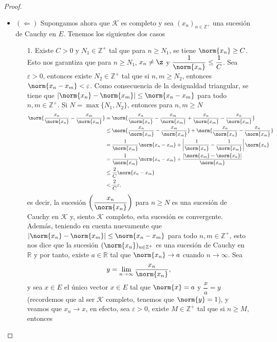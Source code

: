 \begin{proof}
\begin{itemize}
        \item $(\Longleftarrow)$ Supongamos ahora que $\mathcal{K}$ es completo y sea $(x_n)_{n \in \mathbb{Z}^+}$ una sucesión de Cauchy en $E$. Tenemos los siguientes dos casos
        \begin{enumerate}
            \item[1.] Existe $C>0$ y $N_1\in \mathbb{Z}^+$ tal que para $n\geq N_1$, se tiene $\norm{x_n}\geq C$. Esto nos garantiza que para $n\geq N_1$, $x_n\neq \z$ y $\dfrac{1}{\norm{x_n}}\leq \dfrac{1}{C}$. Sea $\varepsilon>0$, entonces existe $N_2 \in \mathbb{Z}^+$ tal que si $n,m \geq N_2$, entonces $\norm{x_n-x_m}<\varepsilon$. Como consecuencia de la desigualdad triangular, se tiene que $|\norm{x_n}-\norm{x_m}|\leq \norm{x_n-x_m}$ para todo $n,m \in \mathbb{Z}^+$. Si $N=\max\{N_1,N_2\}$, entonces para $n,m\geq N$ 
            \begin{align*}
                \norm{\frac{x_n}{\norm{x_n}}-\frac{x_m}{\norm{x_m}}}&=\norm{\frac{x_n}{\norm{x_n}}-\frac{x_m}{\norm{x_m}}+\frac{x_n}{\norm{x_m}}-\frac{x_n}{\norm{x_m}}}\\
                &\leq \norm{\frac{x_n}{\norm{x_m}}-\frac{x_m}{\norm{x_m}}}+\norm{\frac{x_n}{\norm{x_n}}-\frac{x_n}{\norm{x_m}}}\\
                &=\frac{1}{\norm{x_m}}\norm{x_n-x_m}+\left|\frac{1}{\norm{x_n}}-\frac{1}{\norm{x_m}}\right|\norm{x_n}\\
                &=\frac{1}{\norm{x_m}}\norm{x_n-x_m}+\frac{|\norm{x_m}-\norm{x_n}|}{\norm{x_m}}\\
                &\leq \frac{2}{C}\norm{x_n-x_m}\\
                &<\frac{2}{C}\varepsilon,
            \end{align*}
            es decir, la sucesión $\left(\dfrac{x_n}{\norm{x_n}}\right)$ para $n\geq N$ es una sucesión de Cauchy en $\mathcal{K}$ y, siento $\mathcal{K}$ completo, esta sucesión es convergente. Además, teniendo en cuenta nuevamente que $|\norm{x_n}-\norm{x_m}|\leq \norm{x_n-x_m}$ para todo $n,m \in \mathbb{Z}^+$, esto nos dice que la sucesión $(\norm{x_n})_{n \in \mathbb{Z}^+}$ es una sucesión de Cauchy en $\mathbb{R}$ y por tanto, existe $a \in \mathbb{R}$ tal que  $\norm{x_n}\to a$ cuando $n \to \infty$. Sea 
            \begin{align*}
                y=\lim_{n\to \infty} \frac{x_n}{\norm{x_n}},
            \end{align*}
            y sea $x \in E$ el único vector $x \in E$ tal que $\norm{x}=a$ y $\dfrac{x}{a}=y$ (recordemos que al ser $\mathcal{K}$ completo, tenemos que $\norm{y}=1$), y veamos que $x_n\to x$, en efecto, sea $\varepsilon>0$, existe $M\in \mathbb{Z}^+$ tal que si $n\geq M$, entonces

\end{enumerate}
\end{itemize}
\end{proof}
